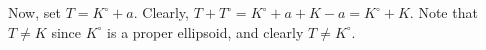 \documentclass[12pt]{article}
\newtheorem{proposition}[theorem]{Proposition}
\theoremstyle{remark}
\newcommand{\Kn}{\mathcal{K}^n}
\newcommand{\ip}[2]{\left\langle #1,#2\right\rangle}
\begin{document}
Now, set $T = K^\circ + a$. Clearly, $T + T^\circ = K^\circ + a + K - a = K^\circ + K$.
Note that $T\neq K$ since $K^\circ$ is a proper ellipsoid, and clearly $T \neq K^\circ$.

\end{document}
